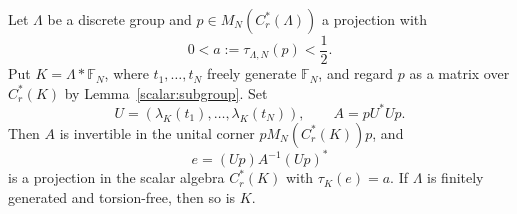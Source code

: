 \begin{proposition}
\label{scalar:compression}
Let \(\Lambda\) be a discrete group and
\(p\in M_N(C_r^*(\Lambda))\) a projection with
\[
 0<a:=\tau_{\Lambda,N}(p)<\frac12.
\]
Put \(K=\Lambda*\mathbb F_N\), where \(t_1,\ldots,t_N\) freely
generate \(\mathbb F_N\), and regard \(p\) as a matrix over
\(C_r^*(K)\) by Lemma~\ref{scalar:subgroup}. Set
\[
 U=(\lambda_K(t_1),\ldots,\lambda_K(t_N)),\qquad
 A=pU^*Up.
\]
Then \(A\) is invertible in the unital corner
\(pM_N(C_r^*(K))p\), and
\begin{equation}
 e=(Up)A^{-1}(Up)^*
 \label{scalar:projection-formula}
\end{equation}
is a projection in the scalar algebra \(C_r^*(K)\) with
\(\tau_K(e)=a\).
If \(\Lambda\) is finitely generated and torsion-free, then so is \(K\).
\end{proposition}

